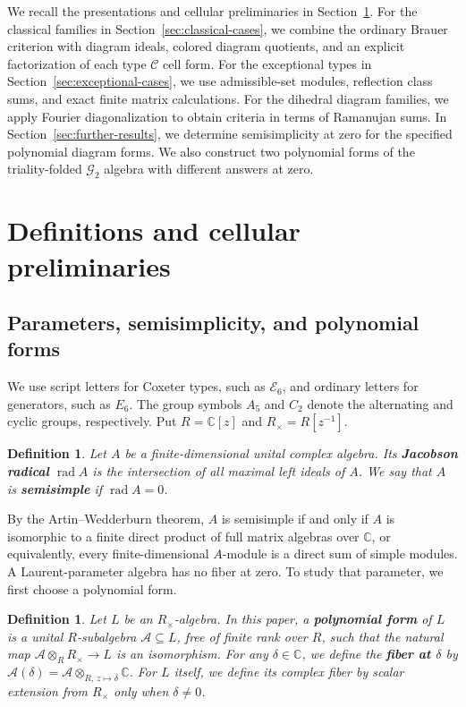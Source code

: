 \documentclass[11pt,a4paper]{amsart}
\theoremstyle{uprightdefinition}
\newtheorem{definition}[theorem]{Definition}
\theoremstyle{remark}\newtheorem{remark}[theorem]{Remark}
\begin{document}
We recall the presentations and cellular preliminaries in
Section~\ref{sec:preliminaries}. For the classical families in
Section~\ref{sec:classical-cases}, we combine the ordinary Brauer criterion
with diagram ideals, colored diagram quotients, and an explicit
factorization of each type $\mathscr{C}$ cell form. For the exceptional types in
Section~\ref{sec:exceptional-cases}, we use admissible-set modules,
reflection class sums, and exact finite matrix calculations. For the
dihedral diagram families, we apply Fourier diagonalization to obtain criteria in
terms of Ramanujan sums. In Section~\ref{sec:further-results},
we determine semisimplicity at zero for the specified polynomial diagram
forms. We also construct two polynomial forms of the triality-folded
$\mathscr{G}_2$ algebra with different answers at zero.

\section{Definitions and cellular preliminaries}
\label{sec:preliminaries}

\subsection{Parameters, semisimplicity, and polynomial forms}
We use script letters for Coxeter types, such as $\mathscr{E}_6$, and
ordinary letters for generators, such as $E_6$. The group symbols $A_5$
and $C_2$ denote the alternating and cyclic groups, respectively.
Put $R=\mathbb C[z]$ and $R_\times=R[z^{-1}]$.

\begin{definition}\label{def:semisimplicity}
Let $A$ be a finite-dimensional unital complex algebra. Its
\textbf{Jacobson radical} $\operatorname{rad}A$ is the intersection of
all maximal left ideals of $A$. We say that $A$ is \textbf{semisimple} if
$\operatorname{rad}A=0$.
\end{definition}

By the Artin--Wedderburn theorem, $A$ is semisimple if and only if $A$ is isomorphic to a
finite direct product of full matrix algebras over $\mathbb C$, or equivalently, every
finite-dimensional $A$-module is a direct sum of simple modules.
A Laurent-parameter algebra has no fiber at zero. To study that parameter, we first choose a polynomial form.

\begin{definition}\label{def:polynomial-form}
Let $L$ be an $R_\times$-algebra. In this paper, a \textbf{polynomial form} of $L$
is a unital $R$-subalgebra $\mathcal A\subseteq L$, free of finite rank
over $R$, such that the natural map
$\mathcal A\otimes_RR_\times\longrightarrow L$ is an isomorphism.
For any $\delta\in\mathbb C$, we define the \textbf{fiber at $\delta$} by
$\mathcal A(\delta)=\mathcal A\otimes_{R,\,z\mapsto\delta}\mathbb C$.
For $L$ itself, we define its complex fiber by scalar extension from $R_\times$
only when $\delta\ne0$.
\end{definition}
\end{document}
